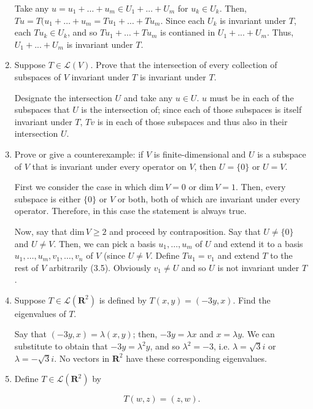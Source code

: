 \documentclass{book}
\begin{document}
\begin{enumerate}
Take any \(u =u_1+\dots+u_m \in U_1 + \dots + U_m\) for \(u_k \in U_k\).  Then, \(Tu=T(u_1+\dots+u_m=Tu_1+\dots+Tu_m\).  Since each \(U_k\) is invariant under \(T\), each \(Tu_k \in U_k\), and so \(Tu_1+\dots+Tu_m\) is contianed in \(U_1 + ... + U_m\).  Thus, \(U_1 + ... + U_m\) is invariant under \(T\).

\item Suppose \(T \in \mathcal{L}(V)\).  Prove that the intersection of every collection of subspaces of \(V\) invariant under \(T\) is invariant under \(T\).

Designate the intersection \(U\) and take any \(u \in U\).  \(u\) must be in each of the subspaces that \(U\) is the intersection of; since each of those subspaces is itself invariant under \(T\), \(Tv\) is in each of those subspaces and thus also in their intersection \(U\).

\item Prove or give a counterexample: if \(V\) is finite-dimensional and \(U\) is a subspace of \(V\) that is invariant under every operator on \(V\), then \(U=\{0\}\) or \(U=V\).

First we consider the case in which \(\textrm{dim} \, V=0\) or \(\textrm{dim} \, V=1\).  Then, every subspace is either \(\{0\}\) or \(V\) or both, both of which are invariant under every operator.  Therefore, in this case the statement is always true.

Now, say that \(\textrm{dim} \, V \geq 2\) and proceed by contraposition.  Say that \(U \neq \{0\}\) and \(U \neq V\).  Then, we can pick a basis \(u_1,\dots,u_m\) of \(U\) and extend it to a basis \(u_1,\dots,u_m,v_1,\dots,v_n\) of \(V\) (since \(U \neq V\).  Define \(Tu_1=v_1\) and extend \(T\) to the rest of \(V\) arbitrarily (3.5).  Obviously \(v_1 \neq U\) and so \(U\) is not invariant under \(T\).

\item Suppose \(T \in \mathcal{L}(\textbf{R}^2)\) is defined by \(T(x,y)=(-3y,x)\).  Find the eigenvalues of \(T\).

Say that \((-3y,x)=\lambda(x,y)\); then, \(-3y=\lambda{x}\) and \(x=\lambda{y}\).  We can substitute to obtain that \(-3y=\lambda^2y\), and so \(\lambda^2=-3\), i.e. \(\lambda=\sqrt{3}i\) or \(\lambda=-\sqrt{3}i\).  No vectors in \(\textbf{R}^2\) have these corresponding eigenvalues.

\item Define \(T \in \mathcal{L}(\textbf{R}^2)\) by

\begin{equation*}
    T(w,z)=(z,w).
\end{equation*}


\end{enumerate}
\end{document}
